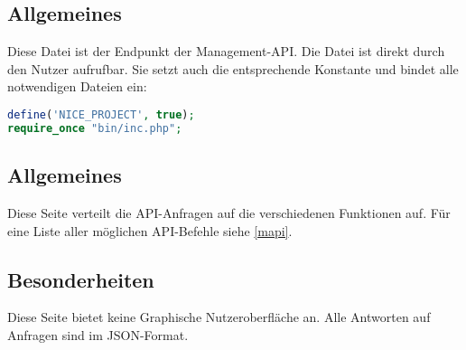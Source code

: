 \subsection{Allgemeines} Diese Datei ist der Endpunkt der Management-API.
Die Datei ist direkt durch den Nutzer aufrufbar. Sie setzt auch die entsprechende Konstante und bindet alle notwendigen Dateien ein:
\begin{lstlisting}[language=php]
define('NICE_PROJECT', true);
require_once "bin/inc.php";
\end{lstlisting}
\subsection{Allgemeines}
Diese Seite verteilt die API-Anfragen auf die verschiedenen Funktionen auf. Für eine Liste aller möglichen API-Befehle siehe \autoref{mapi}.
\subsection{Besonderheiten}
Diese Seite bietet keine Graphische Nutzeroberfläche an. Alle Antworten auf Anfragen sind im JSON-Format.
